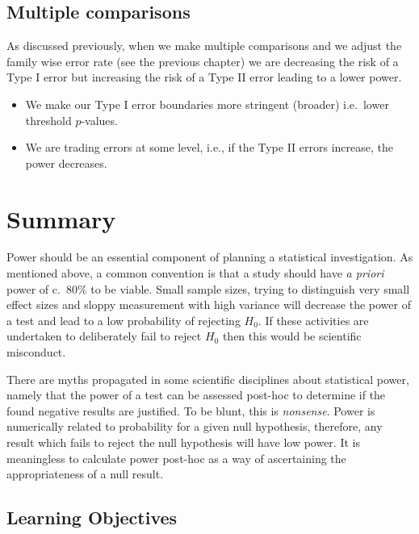 \documentclass[
  oneside]{krantz}
\providecommand{\tightlist}{%
  \setlength{\itemsep}{0pt}\setlength{\parskip}{0pt}}
\begin{document}
\hypertarget{multiple-comparisons-1}{%
\subsection{Multiple comparisons}\label{multiple-comparisons-1}}

As discussed previously, when we make multiple comparisons and we adjust the family wise error rate (see the previous chapter) we are decreasing the risk of a Type I error but increasing the risk of a Type II error leading to a lower power.

\begin{itemize}
\tightlist
\item
  We make our Type I error boundaries more stringent (broader) i.e.~lower threshold \(p\)-values.
\item
  We are trading errors at some level, i.e., if the Type II errors increase, the power decreases.
\end{itemize}

\hypertarget{SUMpower}{%
\section{Summary}\label{SUMpower}}

Power should be an essential component of planning a statistical investigation. As mentioned above, a common convention is that a study should have \textit{a priori} power of c.~80\% to be viable. Small sample sizes, trying to distinguish very small effect sizes and sloppy measurement with high variance will decrease the power of a test and lead to a low probability of rejecting \(H_0\). If these activities are undertaken to deliberately fail to reject \(H_0\) then this would be scientific misconduct.

There are myths propagated in some scientific disciplines about statistical power, namely that the power of a test can be assessed post-hoc to determine if the found negative results are justified. To be blunt, this is \emph{nonsense}. Power is numerically related to probability for a given null hypothesis, therefore, any result which fails to reject the null hypothesis will have low power. It is meaningless to calculate power post-hoc as a way of ascertaining the appropriateness of a null result.

\hypertarget{learning-objectives-1}{%
\subsection{Learning Objectives}\label{learning-objectives-1}}
\end{document}
